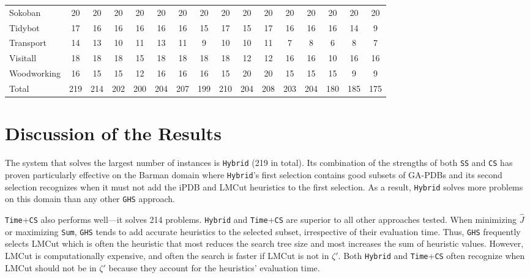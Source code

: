 \begin{table}[htb]
\begin{tabular}{lccccccccccccccc}
Sokoban&       20&     20&    20&   20&   20&   20&  20&   20&    20&  20&   20&   20&   20&    20&  20\\
Tidybot&       17&     16&    16&   16&   16&   16&  15&   17&    15&  17&   16&   16&   16&    14&   9\\
Transport&     14&     13&    10&   11&   13&   11&   9&   10&    10&  11&    7&    8&    6&     8&   7\\
Visitall&      18&     18&    18&   15&   18&   18&  18&   18&    12&  12&   16&   16&   10&    16&  16\\
Woodworking&   16&     15&    15&   12&   16&   16&  16&   15&    20&  20&   15&   15&   15&     9&   9\\ \hline
Total&        219&    214&   202&  200&  204&  207& 199&  210&   204& 208&  203&  204&  180&   185& 175\\ \hline
\end{tabular}
\label{tb_two}
\end{table}

\section{Discussion of the Results}
\noindent
The system that solves the largest number of instances is \texttt{Hybrid} (219 in total). Its combination of the strengths of both \texttt{SS} and \texttt{CS} has proven particularly effective on the Barman domain where \texttt{Hybrid}'s first selection contains good subsets of GA-PDBs and its second selection recognizes when it must not add the iPDB and LMCut heuristics to the first selection. As a result, \texttt{Hybrid} solves more problems on this domain than any other \texttt{GHS} approach. 

\texttt{Time}+\texttt{CS} also performs well---it solves 214 problems.  \texttt{Hybrid} and \texttt{Time}+\texttt{CS} are superior to all other approaches tested. %
When minimizing $\hat{J}$ or maximizing \texttt{Sum}, \texttt{GHS} tends to add accurate heuristics to the selected subset, irrespective of their evaluation time. Thus, \texttt{GHS} frequently selects LMCut which is often the heuristic that most reduces the search tree size and most increases the sum of heuristic values. However, LMCut is computationally expensive, and often  the search is faster if LMCut is not in $\zeta'$. Both \texttt{Hybrid} and \texttt{Time}+\texttt{CS} often recognize when LMCut should not be in $\zeta'$ because they account for the heuristics' evaluation time.


